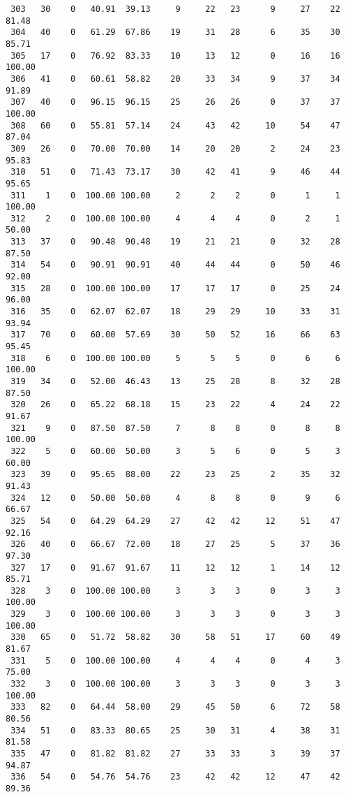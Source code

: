 \begin{verbatim}
 303   30    0   40.91  39.13     9     22   23      9     27    22    81.48
 304   40    0   61.29  67.86    19     31   28      6     35    30    85.71
 305   17    0   76.92  83.33    10     13   12      0     16    16   100.00
 306   41    0   60.61  58.82    20     33   34      9     37    34    91.89
 307   40    0   96.15  96.15    25     26   26      0     37    37   100.00
 308   60    0   55.81  57.14    24     43   42     10     54    47    87.04
 309   26    0   70.00  70.00    14     20   20      2     24    23    95.83
 310   51    0   71.43  73.17    30     42   41      9     46    44    95.65
 311    1    0  100.00 100.00     2      2    2      0      1     1   100.00
 312    2    0  100.00 100.00     4      4    4      0      2     1    50.00
 313   37    0   90.48  90.48    19     21   21      0     32    28    87.50
 314   54    0   90.91  90.91    40     44   44      0     50    46    92.00
 315   28    0  100.00 100.00    17     17   17      0     25    24    96.00
 316   35    0   62.07  62.07    18     29   29     10     33    31    93.94
 317   70    0   60.00  57.69    30     50   52     16     66    63    95.45
 318    6    0  100.00 100.00     5      5    5      0      6     6   100.00
 319   34    0   52.00  46.43    13     25   28      8     32    28    87.50
 320   26    0   65.22  68.18    15     23   22      4     24    22    91.67
 321    9    0   87.50  87.50     7      8    8      0      8     8   100.00
 322    5    0   60.00  50.00     3      5    6      0      5     3    60.00
 323   39    0   95.65  88.00    22     23   25      2     35    32    91.43
 324   12    0   50.00  50.00     4      8    8      0      9     6    66.67
 325   54    0   64.29  64.29    27     42   42     12     51    47    92.16
 326   40    0   66.67  72.00    18     27   25      5     37    36    97.30
 327   17    0   91.67  91.67    11     12   12      1     14    12    85.71
 328    3    0  100.00 100.00     3      3    3      0      3     3   100.00
 329    3    0  100.00 100.00     3      3    3      0      3     3   100.00
 330   65    0   51.72  58.82    30     58   51     17     60    49    81.67
 331    5    0  100.00 100.00     4      4    4      0      4     3    75.00
 332    3    0  100.00 100.00     3      3    3      0      3     3   100.00
 333   82    0   64.44  58.00    29     45   50      6     72    58    80.56
 334   51    0   83.33  80.65    25     30   31      4     38    31    81.58
 335   47    0   81.82  81.82    27     33   33      3     39    37    94.87
 336   54    0   54.76  54.76    23     42   42     12     47    42    89.36

\end{verbatim}
